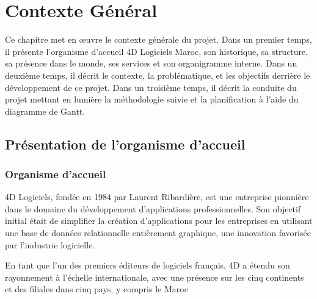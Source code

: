
\chapter{Contexte Général}
\pagestyle{chapterstyle}
Ce chapitre met en œuvre le contexte générale du projet. Dans un premier temps, il
présente l’organisme d’accueil 4D Logiciels Maroc, son historique, sa structure, sa présence
dans le monde, ses services et son organigramme interne. Dans un deuxième temps, il décrit le contexte,
la problématique,  et les objectifs derrière le développement de ce projet. Dans
un troisième temps, il décrit la conduite du projet mettant en lumière la méthodologie
suivie et la planification à l’aide du diagramme de Gantt.



\newpage
\vspace{1cm}



\section{Présentation de l’organisme d’accueil}
\subsection{Organisme d'accueil}

4D Logiciels, fondée en 1984 par Laurent Ribardière, est une entreprise pionnière dans
le domaine du développement d’applications professionnelles. Son objectif initial était de
simplifier la création d’applications pour les entreprises en utilisant une base de données
relationnelle entièrement graphique, une innovation favorisée par l’industrie logicielle.
\newline

En tant que l’un des premiers éditeurs de logiciels français, 
4D a étendu son rayonnement à l’échelle internationale, avec 
une présence sur les cinq continents et des filiales
dans cinq pays, y compris le Maroc


